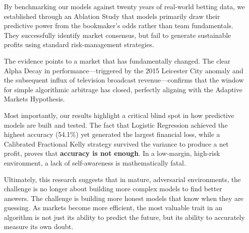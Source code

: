 \documentclass[pdflatex,sn-basic]{sn-jnl}
\begin{document}
By benchmarking our models against twenty years of real-world betting data, we established through an Ablation Study that models primarily draw their predictive power from the bookmaker's odds rather than team fundamentals. They successfully identify market consensus, but fail to generate sustainable profits using standard risk-management strategies.

The evidence points to a market that has fundamentally changed. The clear Alpha Decay in performance—triggered by the 2015 Leicester City anomaly and the subsequent influx of television broadcast revenue—confirms that the window for simple algorithmic arbitrage has closed, perfectly aligning with the Adaptive Markets Hypothesis. 

Most importantly, our results highlight a critical blind spot in how predictive models are built and tested. The fact that Logistic Regression achieved the highest accuracy (54.1\%) yet generated the largest financial loss, while a Calibrated Fractional Kelly strategy survived the variance to produce a net profit, proves that \textbf{accuracy is not enough}. In a low-margin, high-risk environment, a lack of self-awareness is mathematically fatal.

Ultimately, this research suggests that in mature, adversarial environments, the challenge is no longer about building more complex models to find better answers. The challenge is building more honest models that know when they are guessing. As markets become more efficient, the most valuable trait in an algorithm is not just its ability to predict the future, but its ability to accurately measure its own doubt.
\end{document}
